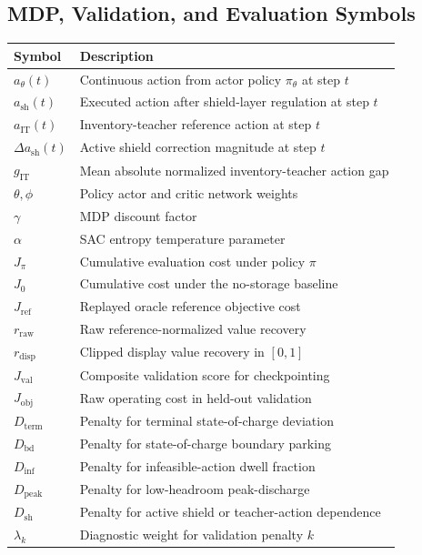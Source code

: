 \subsection*{MDP, Validation, and Evaluation Symbols}
\begin{tabular}{@{}>{\raggedright\arraybackslash}p{}@{\hspace{0.5em}}>{\raggedright\arraybackslash}p{}@{}}
\toprule
Symbol & Description \\
\midrule
$a_{\theta}(t)$ & Continuous action from actor policy $\pi_{\theta}$ at step $t$ \\
$a_{\mathrm{sh}}(t)$ & Executed action after shield-layer regulation at step $t$ \\
$a_{\mathrm{IT}}(t)$ & Inventory-teacher reference action at step $t$ \\
$\Delta a_{\mathrm{sh}}(t)$ & Active shield correction magnitude at step $t$ \\
$g_{\mathrm{IT}}$ & Mean absolute normalized inventory-teacher action gap \\
$\theta, \phi$ & Policy actor and critic network weights \\
$\gamma$ & MDP discount factor \\
$\alpha$ & SAC entropy temperature parameter \\
$J_{\pi}$ & Cumulative evaluation cost under policy $\pi$ \\
$J_{0}$ & Cumulative cost under the no-storage baseline \\
$J_{\mathrm{ref}}$ & Replayed oracle reference objective cost \\
$r_{\mathrm{raw}}$ & Raw reference-normalized value recovery \\
$r_{\mathrm{disp}}$ & Clipped display value recovery in $[0,1]$ \\
$J_{\mathrm{val}}$ & Composite validation score for checkpointing \\
$J_{\mathrm{obj}}$ & Raw operating cost in held-out validation \\
$D_{\mathrm{term}}$ & Penalty for terminal state-of-charge deviation \\
$D_{\mathrm{bd}}$ & Penalty for state-of-charge boundary parking \\
$D_{\mathrm{inf}}$ & Penalty for infeasible-action dwell fraction \\
$D_{\mathrm{peak}}$ & Penalty for low-headroom peak-discharge \\
$D_{\mathrm{sh}}$ & Penalty for active shield or teacher-action dependence \\
$\lambda_k$ & Diagnostic weight for validation penalty $k$ \\
\bottomrule
\end{tabular}
